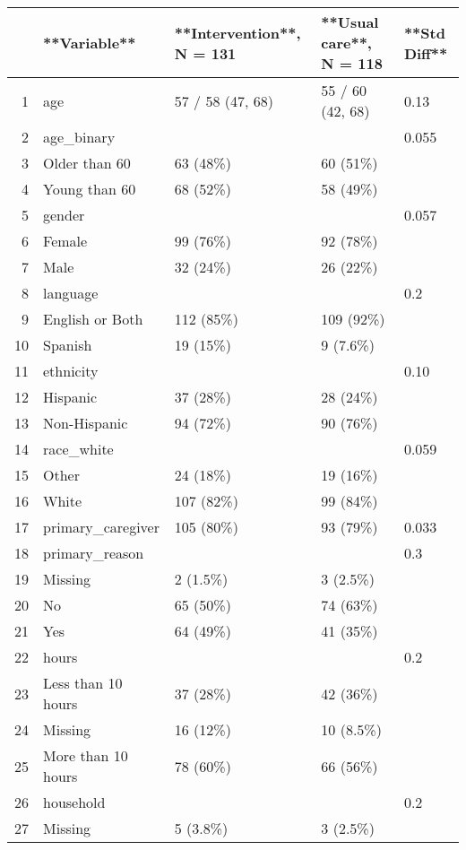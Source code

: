 \begin{table}[ht]
\centering
\begin{tabular}{rllll}
  \hline
 & **Variable** & **Intervention**, N = 131 & **Usual care**, N = 118 & **Std Diff** \\ 
  \hline
1 & age & 57 / 58 (47, 68) & 55 / 60 (42, 68) & 0.13 \\ 
  2 & age\_binary &  &  & 0.055 \\ 
  3 & Older than 60 & 63 (48\%) & 60 (51\%) &  \\ 
  4 & Young than 60 & 68 (52\%) & 58 (49\%) &  \\ 
  5 & gender &  &  & 0.057 \\ 
  6 & Female & 99 (76\%) & 92 (78\%) &  \\ 
  7 & Male & 32 (24\%) & 26 (22\%) &  \\ 
  8 & language &  &  & 0.2 \\ 
  9 & English or Both & 112 (85\%) & 109 (92\%) &  \\ 
  10 & Spanish & 19 (15\%) & 9 (7.6\%) &  \\ 
  11 & ethnicity &  &  & 0.10 \\ 
  12 & Hispanic & 37 (28\%) & 28 (24\%) &  \\ 
  13 & Non-Hispanic & 94 (72\%) & 90 (76\%) &  \\ 
  14 & race\_white &  &  & 0.059 \\ 
  15 & Other & 24 (18\%) & 19 (16\%) &  \\ 
  16 & White & 107 (82\%) & 99 (84\%) &  \\ 
  17 & primary\_caregiver & 105 (80\%) & 93 (79\%) & 0.033 \\ 
  18 & primary\_reason &  &  & 0.3 \\ 
  19 & Missing & 2 (1.5\%) & 3 (2.5\%) &  \\ 
  20 & No & 65 (50\%) & 74 (63\%) &  \\ 
  21 & Yes & 64 (49\%) & 41 (35\%) &  \\ 
  22 & hours &  &  & 0.2 \\ 
  23 & Less than 10 hours & 37 (28\%) & 42 (36\%) &  \\ 
  24 & Missing & 16 (12\%) & 10 (8.5\%) &  \\ 
  25 & More than 10 hours & 78 (60\%) & 66 (56\%) &  \\ 
  26 & household &  &  & 0.2 \\ 
  27 & Missing & 5 (3.8\%) & 3 (2.5\%) &  \\ 

\end{tabular}
\end{table}
